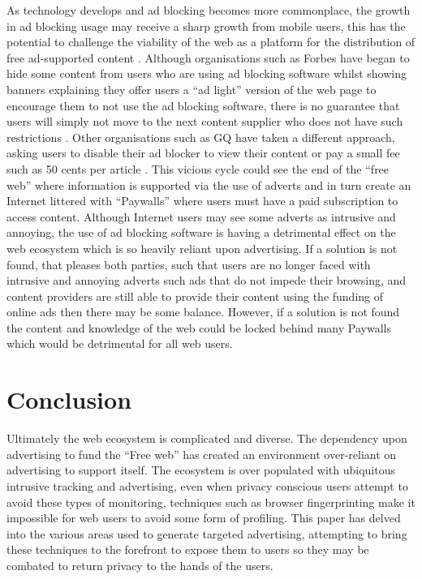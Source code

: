 \documentclass{article}
\begin{document}
As technology develops and ad blocking becomes more commonplace, the growth in ad blocking usage may receive a sharp growth from mobile users,  this has the potential to challenge the viability of the web as a platform for the distribution of free ad-supported content \parencite{adobeAdBlock}. Although organisations such as Forbes have began to hide some content from users who are using ad blocking software whilst showing banners explaining they offer users a ``ad light'' version of the web page to encourage them to not use the ad blocking software, there is no guarantee that users will simply not move to the next content supplier who does not have such restrictions \parencite{publishersWeb}. Other organisations such as GQ have taken a different approach, asking users to disable their ad blocker to view their content or pay a small fee such as 50 cents per article \parencite{gq}.  This vicious cycle could see the end of the ``free web'' where information is supported via the use of adverts and in turn create an Internet littered with ``Paywalls'' where users must have a paid subscription to access content. Although Internet users may see some adverts as intrusive and annoying, the use of ad blocking software is having a detrimental effect on the web ecosystem which is so heavily reliant upon advertising. If a solution is not found, that pleases both parties, such that users are no longer faced with intrusive and annoying adverts such ads that do not impede their browsing, and content providers are still able to provide their content using the funding of online ads then there may be some balance. However, if a solution is not found the content and knowledge of the web could be locked behind many Paywalls which would be detrimental for all web users. 

\section{Conclusion}
Ultimately the web ecosystem is complicated and diverse. The dependency upon advertising to fund the ``Free web'' has created an environment over-reliant on advertising to support itself. The ecosystem is over populated with ubiquitous intrusive tracking and advertising, even when privacy conscious users attempt to avoid these types of monitoring, techniques such as browser fingerprinting make it impossible for web users to avoid some form of profiling. This paper has delved into the various areas used to generate targeted advertising, attempting to bring these techniques to the forefront to expose them to users so they may be combated to return privacy to the hands of the users.
\end{document}

